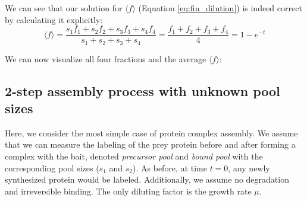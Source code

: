 \documentclass{article}
\newcommand{\fin}{\ensuremath{\langle f \rangle}}
\begin{document}
We can see that our solution for $\fin$ (Equation \ref{eq:fin_dilution}) is indeed correct by calculating it explicitly:
\begin{equation}
    \fin = \frac{s_1 f_1 + s_2 f_2 + s_3 f_3 + s_4 f_4}{s_1 + s_2 + s_3 + s_4} = \frac{f_1 + f_2 + f_3 + f_4}{4} = 1 - e^{-t}
\end{equation}

We can now visualize all four fractions and the average $\fin$:
\begin{center}
\end{center}

\subsection{2-step assembly process with unknown pool sizes}
Here, we consider the most simple case of protein complex assembly. We assume that we can measure the labeling of the prey protein before and after forming a complex with the bait, denoted \textit{precursor pool} and \textit{bound pool} with the corresponding pool sizes ($s_1$ and $s_2$). As before, at time $t = 0$, any newly synthesized protein would be labeled. Additionally, we assume no degradation and irreversible binding. The only diluting factor is the growth rate $\mu$.
\end{document}
